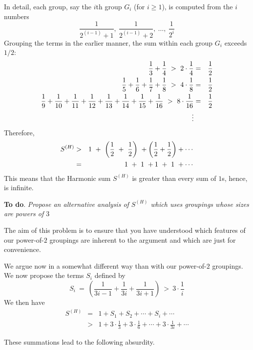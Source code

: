 \begin{itemize}
In detail, each group, say the $i$th group $G_i$ (for $i \geq 1$), is computed from the $i$ numbers
\[ \frac{1}{2^{(i-1)}+1}, \ \frac{1}{2^{(i-1)}+2}, \ \ldots, \ \frac{1}{2^{i}}  \]
Grouping the terms in the earlier manner, the sum within each group $G_i$ exceeds $1/2$:
\begin{eqnarray*}
{1 \over 3} + {1 \over 4} \ > \ 2 \cdot {1 \over 4} & = & {1 \over 2} \\ \smallskip
{1 \over 5} + {1 \over 6} + {1 \over 7}+ {1 \over 8} \ > \ 4 \cdot {1 \over 8} & = & {1 \over 2}  \\  \smallskip
{1 \over 9} + {1 \over 10} + {1 \over 11}  +{1 \over 12} + {1 \over 13} + {1 \over 14} + {1 \over 15} + {1 \over 16}  \ > \ 8 \cdot {1 \over 16} & = & {1 \over 2}  \\  \smallskip
\vdots
\end{eqnarray*}
Therefore, 
\begin{eqnarray*}
S^{(H)} & > & 1 \ + \ \left( {1 \over 2} \ + \ {1 \over 2} \right) \ + \left( {1 \over 2} + {1 \over 2} \right) + \cdots \\
             & = & 1 \ + \ 1 \ +  1 \ + \ 1 \ + \cdots
\end{eqnarray*}
This means that the Harmonic sum $S^{(H)}$ is greater than every sum of $1$s, hence, is infinite.

\medskip

{\bf To do}. {\em Propose an alternative analysis of $S^{(H)}$ which uses groupings whose sizes are powers of $3$}

\smallskip

The aim of this problem is to ensure that you have understood which features of our power-of-$2$ groupings are inherent to the argument and which are just for convenience.

\smallskip

We argue now in a somewhat different way than with our power-of-$2$ groupings.  We now propose the terms $S_i$ defined by
\[ 
S_i \ = \ \left( \frac{1}{3i-1} + \frac{1}{3i} + \frac{1}{3i+1} \right) \ >  \ 3 \cdot \frac{1}{i}
 \]
We then have
\begin{eqnarray}
\nonumber
S^{(H)}  & = & 1 + S_1 +  S_2 + \cdots + S_i + \cdots  \\
\label{eq:harmonic-by-3}
             & >  & 1 + 3 \cdot \frac{1}{3} + 3 \cdot \frac{1}{6} + \cdots + 3 \cdot \frac{1}{3i} + \cdots
\end{eqnarray}

These summations lead to the following absurdity.


\end{itemize}
